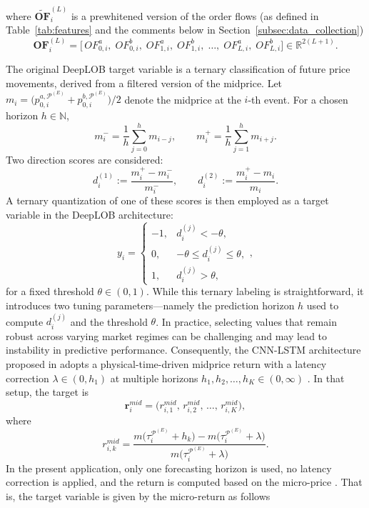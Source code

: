 \documentclass[10pt,a4paper,oneside]{article}
\begin{document}
where $\widetilde{\mathbf{OF}}^{(L)}_i$ is a prewhitened version of the order flows (as defined in Table~\ref{tab:features} and the comments below in Section~\ref{subsec:data_collection})
\[
    \mathbf{OF}^{(L)}_i
    =
    \bigl[\,OF^a_{0, i},\;
        OF^b_{0, i},\; OF^a_{1, i},\; OF^b_{1, i},\; \dots,\; OF^a_{L, i},\; OF^b_{L, i}\bigr]
    \in \mathbb{R}^{2(L + 1)}.
\]

The original DeepLOB target variable is a ternary classification of future price movements, derived from a filtered version of the midprice. Let $m_i = \bigl(p^{a, \mathcal{P}^{(E)}}_{0,i} + p^{b, \mathcal{P}^{(E)}}_{0,i}\bigr) / 2$ denote the midprice at the $i$-th event. For a chosen horizon $h \in \mathbb{N}$,
\[
    m_i^- = \frac{1}{h}\sum_{j=0}^{h} m_{i-j},
    \quad\quad
    m_i^+ = \frac{1}{h}\sum_{j=1}^{h} m_{i+j}.
\]
Two direction scores are considered:
\[
    d_i^{(1)} := \frac{m_i^+ - m_i^-}{m_i^-},
    \quad\quad
    d_i^{(2)} := \frac{m_i^+ - m_i}{m_i}.
\]
A ternary quantization of one of these scores is then employed as a target variable in the DeepLOB architecture:
\[
    y_i =
    \begin{cases}
        -1, & d_i^{(j)} < -\theta,              \\[6pt]
        0,  & -\theta \le d_i^{(j)} \le \theta, \\[6pt]
        1,  & d_i^{(j)} > \theta,
    \end{cases},
\]
for a fixed threshold \(\theta \in (0, 1)\). While this ternary labeling is straightforward, it introduces two tuning parameters—namely the prediction horizon \(h\) used to compute \(d_i^{(j)}\) and the threshold \(\theta\). In practice, selecting values that remain robust across varying market regimes can be challenging and may lead to instability in predictive performance. Consequently, the CNN-LSTM architecture proposed in \cite{kolm2023deep} adopts a physical-time-driven midprice return with a latency correction \(\lambda \in (0, h_1)\) at multiple horizons \(h_1, h_2, \dots, h_K \in (0, \infty)\) . In that setup, the target is
\[
    \mathbf{r}^{mid}_i
    =
    \bigl(r^{mid}_{i, 1},\, r^{mid}_{i, 2},\, \dots,\, r^{mid}_{i, K}\bigr),
\]
where
\[
    r^{mid}_{i, k}
    =
    \frac{m\bigl(\tau^{\mathcal{P}^{(E)}}_i + h_k\bigr)
        - m\bigl(\tau^{\mathcal{P}^{(E)}}_i + \lambda\bigr)}
    {m\bigl(\tau^{\mathcal{P}^{(E)}}_i + \lambda\bigr)}.
\]
In the present application, only one forecasting horizon is used, no latency correction is applied, and the return is computed based on the micro-price \cite{gatheral2010zero}. That is, the target variable is given by the micro-return as follows
\end{document}
